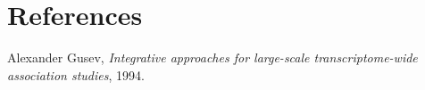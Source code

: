 \documentclass[10pt]{article}
\begin{document}
\section*{References}
%
%
%
\begin{thebibliography}{9}

  Alexander Gusev,
  \emph{Integrative approaches for large-scale transcriptome-wide association studies},
  1994.
\end{thebibliography}
\end{document}
